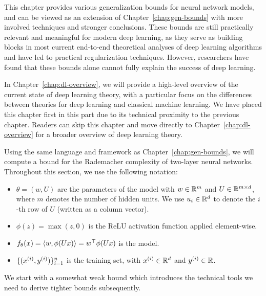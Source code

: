 This chapter provides various generalization bounds for neural network models, and can be viewed as an extension of Chapter~\ref{chap:gen-bounds} with more involved techniques and stronger conclusions. 
These bounds are still practically relevant and meaningful for modern deep learning, as they serve as building blocks in most current end-to-end theoretical analyses of deep learning algorithms and have led to practical regularization techniques. However, researchers have found that these bounds alone cannot fully explain the success of deep learning.


In Chapter~\ref{chap:dl-overview}, we will provide a high-level overview of the current state of deep learning theory, with a particular focus on the differences between theories for deep learning and classical machine learning. We have placed this chapter first in this part due to its technical proximity to the previous chapter. Readers can skip this chapter and move directly to Chapter~\ref{chap:dl-overview} for a broader overview of deep learning theory. 



Using the same language and framework as Chapter~\ref{chap:gen-bounds}, we will compute a bound for the Rademacher complexity of two-layer neural networks.  Throughout this section, we use the following notation:
\begin{itemize}
    \item $\theta = (w, U)$ are the parameters of the model with $w \in \R^m$ and $U \in \R^{m \times d}$, where $m$ denotes the number of hidden units. We use $u_i\in\R^d$ to denote the $i$-th row of $U$ (written as a column vector).
    \item $\phi(z) = \max(z, 0)$ is the ReLU activation function applied element-wise.
    \item $f_\theta(x) = \inprod{w,\phi(Ux)} = w^\top \phi(Ux)$ is the model.
    \item $\{ (x\sp{i}, y\sp{i}) \}_{i=1}^n$ is the training set, with $x\sp{i}\in\R^d$ and $y\sp{i}\in\R$.
\end{itemize}
We start with a somewhat weak bound which introduces the technical tools we need to derive tighter bounds subsequently.

